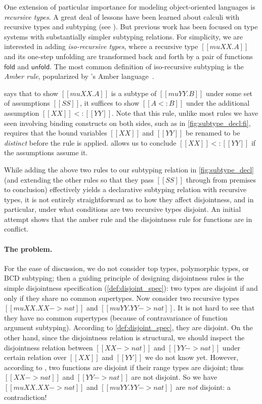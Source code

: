 One extension of particular importance for modeling object-oriented languages is
\emph{recursive types}. A great deal of lessons have been learned about
calculi with recursive types and subtyping (see \citet[chap.
20]{DBLP:books/daglib/0005958}). But previous work has been focused on type
systems with substantially simpler subtyping relations. For simplicity, we are
interested in adding \emph{iso-recursive types}, where a recursive type $[[mu XX . A]]$ and its one-step unfolding are transformed back and forth by a pair
of functions $\mathsf{fold}$ and $\mathsf{unfold}$. The most common definition
of iso-recursive subtyping is the \emph{Amber rule}, popularized by
\citeauthor{DBLP:conf/litp/Cardelli85}'s Amber language~\citep{DBLP:conf/litp/Cardelli85}.
\begin{mathpar}
\end{mathpar}
 says that to show $[[mu XX . A]] $ is a subtype of $ [[mu YY .
B]]$ under some set of assumptions $[[SS]]$, it suffices to show $[[A <: B]]$
under the additional assumption $[[XX]] <: [[YY]]$. Note that this rule, unlike
most rules we have seen involving binding constructs on both sides, such as
 in \cref{fig:subtype_decl:fi}, requires that the bound variables
$[[XX]]$ and $[[YY]]$ be renamed to be \emph{distinct} before the rule is
applied.  allows us to conclude $[[XX]] <: [[YY]]$ if the
assumptions assume it.

While adding the above two rules to our subtyping relation in
\cref{fig:subtype_decl} (and extending the other rules so that they pass
$[[SS]]$ through from premises to conclusion) effectively yields a declarative
subtyping relation with recursive types, it is not entirely straightforward as
to how they affect disjointness, and in particular, under what conditions are
two recursive types disjoint. An initial attempt shows that the amber rule and
the disjointness rule for functions are in conflict.

\paragraph{The problem.}

For the ease of discussion, we do not consider top types, polymorphic types, or
BCD subtyping; then a guiding principle of designing disjointness rules is the
simple disjointness specification (\cref{def:disjoint_spec}): two types are
disjoint if and only if they share no common supertypes. Now consider two
recursive types $[[ mu XX . XX -> nat ]]$ and $[[ mu YY . YY -> nat]]$. It is
not hard to see that they have no common supertypes (because of contravariance of function argument subtyping). According to
\cref{def:disjoint_spec}, they are disjoint. On the other hand, since the
disjointness relation is structural, we should inspect the disjointness relation
between $[[ XX -> nat ]]$ and $[[YY -> nat ]]$ under certain relation over
$[[XX]]$ and $[[YY]]$ we do not know yet. However, according to , two functions are
disjoint if their range types are disjoint; thus $[[ XX -> nat ]]$ and $[[YY ->
nat ]]$ are not disjoint. So we have $[[ mu XX . XX -> nat]]$ and $[[ mu YY . YY -> nat]]$
are \emph{not} disjoint: a contradiction!


